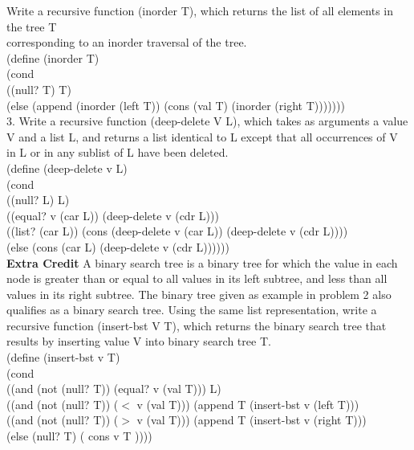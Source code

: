 \documentclass[12pt]{article}
\begin{document}
\begin{flushleft}
\qquad \qquad Write a recursive function (inorder T), which returns the list of all elements in the tree T\\
\qquad \qquad corresponding to an inorder traversal of the tree.\\
[2mm]

\qquad \qquad \qquad (define (inorder T)\\
\qquad \qquad \qquad \qquad (cond\\
\qquad \qquad \qquad \qquad \qquad ((null? T) T)\\
\qquad \qquad \qquad \qquad \qquad (else (append (inorder (left T)) (cons	(val T) (inorder (right T)))))))\\	
[30mm]

3. Write a recursive function (deep-delete V L), which takes as arguments a value 
V and a list L, and returns a list identical to L except that all occurrences of V
in L or in any sublist of L have been deleted.\\

\qquad \qquad \qquad (define (deep-delete v L)\\
\qquad \qquad \qquad \qquad (cond\\
\qquad \qquad \qquad \qquad \qquad ((null? L) L)\\
\qquad \qquad \qquad \qquad \qquad ((equal? v (car L)) (deep-delete v (cdr L)))\\
\qquad \qquad \qquad \qquad \qquad ((list? (car L)) (cons (deep-delete v (car L)) (deep-delete v (cdr L))))\\
\qquad \qquad \qquad \qquad \qquad (else (cons (car L) (deep-delete v (cdr L))))))\\
[6mm]

\textbf{Extra Credit}
A binary search tree is a binary tree for which the value in each node is greater  than or equal to all values in its left subtree, and less than all values in its right subtree. The binary tree given as example in problem 2 also qualifies as a binary search tree.  Using the same list representation, write a recursive function (insert-bst V T), which returns the binary search tree that results by inserting value V into binary search tree T.\\
[2mm]

\qquad \qquad \qquad (define (insert-bst v T)\\
\qquad \qquad \qquad \qquad (cond\\
\qquad \qquad \qquad \qquad \qquad ((and (not (null? T)) (equal? v (val T))) L)\\
\qquad \qquad \qquad \qquad \qquad ((and (not (null? T)) ($<$ v (val T))) (append T (insert-bst v (left T)))\\
\qquad \qquad \qquad \qquad \qquad((and (not (null? T)) ($>$ v (val T))) (append T (insert-bst v (right T)))\\
\qquad \qquad \qquad \qquad \qquad(else (null? T) ( cons v T ))))\\
[2mm]


\end{flushleft}
\end{document}
